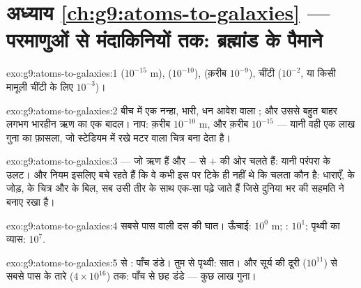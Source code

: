 \section*{अध्याय \ref{ch:g9:atoms-to-galaxies} --- परमाणुओं से मंदाकिनियों तक: ब्रह्मांड के पैमाने}

\begin{solution}{exo:g9:atoms-to-galaxies:1}
 ($10^{-15}$ \unit{m}),  ($10^{-10}$),  (क़रीब
$10^{-9}$), चींटी ($10^{-2}$, या किसी मामूली चींटी के लिए $10^{-3}$)।
\end{solution}

\begin{solution}{exo:g9:atoms-to-galaxies:2}
बीच में एक नन्हा, भारी, धन आवेश वाला ; और उससे बहुत बाहर लगभग
भारहीन ऋण  का एक बादल। नाप:  क़रीब $10^{-10}$
\unit{m}, और  क़रीब $10^{-15}$ --- यानी वही एक लाख गुना का
फ़ासला, जो स्टेडियम में रखे मटर वाला चित्र बना देता है।
\end{solution}

\begin{solution}{exo:g9:atoms-to-galaxies:3}
 --- जो ऋण हैं और $-$ से $+$ की ओर चलते हैं: यानी परंपरा के
उलट। और नियम इसलिए बचे रहते हैं कि वे कभी इस पर टिके ही नहीं थे कि
चलता कौन है: धाराएँ,  के जोड़,  के चित्र और  के बिल, सब उसी
तीर के साथ एक-सा पढ़े जाते हैं जिसे दुनिया भर की सहमति ने बनाए रखा है।
\end{solution}

\begin{solution}{exo:g9:atoms-to-galaxies:4}
सबसे पास वाली दस की घात। ऊँचाई: $10^{0}$ \unit{m}; : $10^{1}$;
पृथ्वी का व्यास: $10^{7}$.
\end{solution}

\begin{solution}{exo:g9:atoms-to-galaxies:5}
 से : पाँच डंडे। तुम से पृथ्वी: सात। और सूर्य की दूरी
($10^{11}$) से सबसे पास के तारे ($4 \times 10^{16}$) तक: पाँच से छह
डंडे --- कुछ लाख गुना।
\end{solution}


